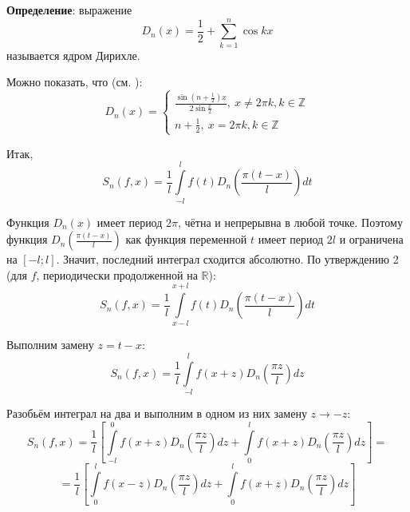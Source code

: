\documentclass[12pt, a4paper, reqno]{article}
\begin{document}
    \textbf{Определение}: выражение
    \begin{equation*}
        D_n(x) = \frac{1}{2} + \sum\limits_{k = 1}^{n}\cos{kx}
    \end{equation*}
    называется ядром Дирихле.

    Можно показать, что (см. \cite{petrovich-2}):
    \begin{equation*}
        D_n(x) =
        \begin{cases}
            \frac{\sin{\left(n + \frac{1}{2}\right)x}}{2\sin{\frac{x}{2}}},\ x \neq 2 \pi k, k \in \mathbb{Z} \\
            n + \frac{1}{2},\ x = 2 \pi k, k \in \mathbb{Z}
        \end{cases}
    \end{equation*}

    Итак,
    \begin{equation*}
        S_n(f, x) = \frac{1}{l}\int\limits_{-l}^{l} f(t) D_n\left(\frac{\pi (t - x)}{l}\right) dt
    \end{equation*}

    Функция $D_n(x)$ имеет период $2\pi$, чётна и непрерывна в любой точке. Поэтому функция
    $D_n\left(\frac{\pi(t - x)}{l}\right)$ как функция переменной $t$ имеет период $2l$ и ограничена
    на $[-l; l]$. Значит, последний интеграл сходится абсолютно. По утверждению 2 (для $f$,
    периодически продолженной на $\mathbb{R}$):
    \begin{equation*}
        S_n(f, x) = \frac{1}{l}\int\limits_{x - l}^{x + l} f(t) D_n\left(\frac{\pi (t - x)}{l}\right) dt
    \end{equation*}

    Выполним замену $z = t - x$:
    \begin{equation*}
        S_n(f, x) = \frac{1}{l}\int\limits_{-l}^{l} f(x + z) D_n\left(\frac{\pi z}{l}\right)dz
    \end{equation*}

    Разобьём интеграл на два и выполним в одном из них замену $z \to -z$:
    \begin{equation*}
        S_n(f, x) = \frac{1}{l}
        \left[
            \int\limits_{-l}^{0} f(x + z) D_n\left(\frac{\pi z}{l}\right)dz +
            \int\limits_{0}^{l} f(x + z) D_n\left(\frac{\pi z}{l}\right)dz
        \right] =
    \end{equation*}
    \begin{equation*}
        = \frac{1}{l}
        \left[
            \int\limits_{0}^{l} f(x - z) D_n\left(\frac{\pi z}{l}\right)dz +
            \int\limits_{0}^{l} f(x + z) D_n\left(\frac{\pi z}{l}\right)dz
        \right]
    \end{equation*}
\end{document}
